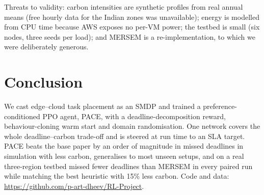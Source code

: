\documentclass[conference]{IEEEtran}
\begin{document}
Threats to validity: carbon intensities are synthetic profiles from real annual means (free hourly data for the Indian zones was unavailable); energy is modelled from CPU time because AWS exposes no per-VM power; the testbed is small (six nodes, three seeds per load); and MERSEM is a re-implementation, to which we were deliberately generous.

\section{Conclusion}
We cast edge--cloud task placement as an SMDP and trained a preference-conditioned PPO agent, PACE, with a deadline-decomposition reward, behaviour-cloning warm start and domain randomisation. One network covers the whole deadline--carbon trade-off and is steered at run time to an SLA target. PACE beats the base paper by an order of magnitude in missed deadlines in simulation with less carbon, generalises to most unseen setups, and on a real three-region testbed missed fewer deadlines than MERSEM in every paired run while matching the best heuristic with 15\% less carbon. Code and data: \url{https://github.com/p-art-dheev/RL-Project}.
\end{document}
